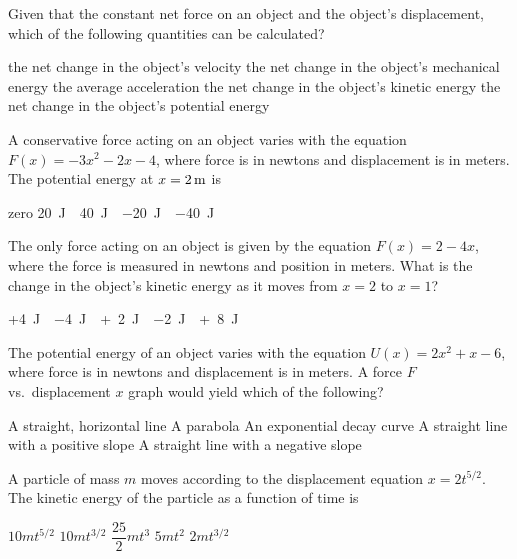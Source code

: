 \documentclass{../../oss-apphys-exam}
\begin{document}
\begin{multicols*}{2}
\begin{multicols*}{2}
\begin{questions}
    \question Given that the constant net force on an object and the object's 
    displacement, which of the following quantities can be calculated?
    \begin{choices}
      \choice the net change in the object's velocity
      \choice the net change in the object's mechanical energy
      \choice the average acceleration
      \choice the net change in the object's kinetic energy
      \choice the net change in the object's potential energy
    \end{choices}
    \columnbreak
    
    \question A conservative force acting on an object varies with the
    equation $F(x)=-3x^2-2x-4$, where force is in newtons and displacement is
    in meters. The potential energy at $x=\SI2\metre$ is
    \begin{choices}
      \choice zero
      \choice\SI{20}\joule
      \choice\SI{40}\joule
      \choice\SI{-20}\joule
      \choice\SI{-40}\joule
    \end{choices}
    
    \question The only force acting on an object is given by the equation
    $F(x)=2-4x$, where the force is measured in newtons and position in meters.
    What is the change in the object's kinetic energy as it moves from $x=2$ to
    $x=1$?
    \begin{choices}
      \choice +\SI{4}\joule
      \choice \SI{-4}\joule
      \choice +\SI{2}\joule
      \choice \SI{-2}\joule
      \choice +\SI{8}\joule
    \end{choices}
    
    \question The potential energy of an object varies with the equation
    $U(x)=2x^2+x-6$, where force is in newtons and displacement is in meters. A
    force $F$ vs.\ displacement $x$ graph would yield which of the following?
    \begin{choices}
      \choice A straight, horizontal line
      \choice A parabola
      \choice An exponential decay curve
      \choice A straight line with a positive slope
      \choice A straight line with a negative slope
    \end{choices}
    \vspace{.7in}
    
    \question A particle of mass $m$ moves according to the displacement
    equation $x=2t^{5/2}$. The kinetic energy of the particle as a function of
    time is
    \begin{choices}
      \choice $10mt^{5/2}$
      \choice $10mt^{3/2}$
      \choice $\dfrac{25}2mt^3$
      \choice $5mt^2$
      \choice $2mt^{3/2}$
    \end{choices}
    \columnbreak
    

\end{questions}
\end{multicols*}
\end{multicols*}
\end{document}
